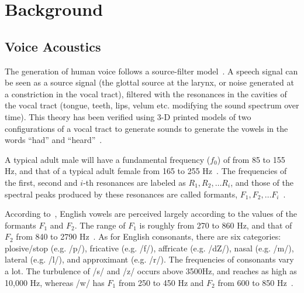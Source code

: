 \section{Background}

\subsection{Voice Acoustics}\label{sec:movovoice}

The generation of human voice follows a source-filter model~\cite{fant1960acoustic}. A speech signal can be seen as a source signal (the glottal source at the larynx, or noise generated at a constriction in the vocal tract), filtered with the resonances in the cavities of the vocal tract (tongue, teeth, lips, velum etc. modifying the sound spectrum over time). This theory has been verified using 3-D printed models of two configurations of a vocal tract to generate sounds to generate the vowels in the words ``had'' and ``heard''~\cite{wolfe2016experimentally}. 

A typical adult male will have a fundamental frequency  ($f_0$) of from 85 to 155 Hz, and that of a typical adult female from 165 to 255 Hz~\cite{baken1987clinical,titze1994principles}. The frequencies of the first, second and $i$-th resonances are labeled as  $R_1, R_2, \ldots R_i$, and those of the spectral peaks produced by these resonances are called formants, $F_1, F_2, \ldots F_i $~\cite{titze2015toward}. 

According to~\cite{ladefoged2014course}, English vowels are perceived largely according to the values of the formants $F_1$ and $F_2$. The range of $F_1$ is roughly from 270 to 860 Hz, and that of $F_2$ from 840 to 2790 Hz~\cite{peterson1952control}. As for English consonants, there are six categories: plosive/stop (e.g. /p/), fricative (e.g. /f/), affricate (e.g. /dZ/), nasal (e.g. /m/), lateral (e.g. /l/), and approximant (e.g. /r/). The frequencies of consonants vary a lot. The turbulence of /s/ and /z/ occurs above 3500Hz, and reaches as high as 10,000 Hz, whereas /w/ has $F_1$ from 250 to 450 Hz and $F_2 $ from 600 to 850 Hz~\cite{ladefoged2012vowels}. 


